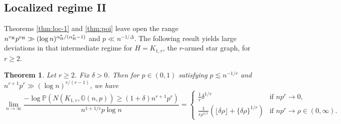 \documentclass[a4paper,11pt,english,reqno]{amsart}
\numberwithin{equation}{section}
\renewcommand{\geq}{\geqslant}
\newcommand{\uH}{\textup{H}}
\renewcommand{\P}{\mathbb{P}}
\newcommand{\G}{\mathbb{G}}
\newtheorem{theorem}{Theorem}[section]
\begin{document}
	
	\subsection{Localized regime II} Theorems \ref{thm:loc-1} and \ref{thm:poi} leave open the range $n^{v_\uH} p^{e_\uH} \gg (\log n)^{\alpha^{*}_{\uH}/\left(\alpha^{*}_{\uH}-1\right)} $ and $p \ll n^{-1/\Delta}$. The following result yields large deviations in that intermediate regime for $H=K_{1,r}$, the $r$-armed star graph, for $r \ge 2$. 
	\begin{theorem}\label{thm:loc-2}
		Let $r\geq 2$. Fix $\delta>0$. Then for $p\in(0,1)$ satisfying $p\lesssim n^{-1/r}$ and $n^{r+1}p^{r}\gg (\log n)^{r/(r-1)}$, we have
		\begin{equation}
			\label{eq:star loc regime 2 result}
			\lim_{n \to \infty}  \frac{-\log\P\left(N(K_{1,r}, \G(n,p))\geq (1+\delta)n^{r+1}p^r\right)}{n^{1+1/r} p \log n} = \begin{cases}
				\frac{1}{r}\delta^{1/r}\quad &\text{if $np^{r}\rightarrow 0$},\\
				\frac{1}{r\rho^{1/r} }\left(\lfloor\delta \rho\rfloor+\{\delta\rho\}^{1/r}\right) &\text{if $np^{r}\rightarrow \rho\in (0,\infty)$}.%
			\end{cases}
		\end{equation}
	\end{theorem}
	
\end{document}
